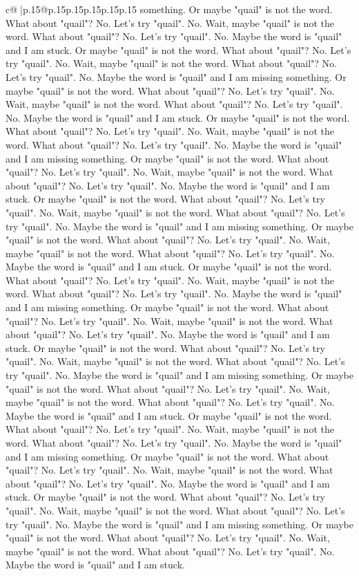 \documentclass{article}
\begin{document}
{\begin{supertabular}{c@{$\;$}|p{.15\linewidth}@{}p{.15\linewidth}p{.15\linewidth}p{.15\linewidth}p{.15\linewidth}p{.15\linewidth}}
{{{something. Or maybe "quail" is not the word. What about "quail"? No. Let's try "quail". No. Wait, maybe "quail" is not the word. What about "quail"? No. Let's try "quail". No. Maybe the word is "quail" and I am stuck. Or maybe "quail" is not the word. What about "quail"? No. Let's try "quail". No. Wait, maybe "quail" is not the word. What about "quail"? No. Let's try "quail". No. Maybe the word is "quail" and I am missing something. Or maybe "quail" is not the word. What about "quail"? No. Let's try "quail". No. Wait, maybe "quail" is not the word. What about "quail"? No. Let's try "quail". No. Maybe the word is "quail" and I am stuck. Or maybe "quail" is not the word. What about "quail"? No. Let's try "quail". No. Wait, maybe "quail" is not the word. What about "quail"? No. Let's try "quail". No. Maybe the word is "quail" and I am missing something. Or maybe "quail" is not the word. What about "quail"? No. Let's try "quail". No. Wait, maybe "quail" is not the word. What about "quail"? No. Let's try "quail". No. Maybe the word is "quail" and I am stuck. Or maybe "quail" is not the word. What about "quail"? No. Let's try "quail". No. Wait, maybe "quail" is not the word. What about "quail"? No. Let's try "quail". No. Maybe the word is "quail" and I am missing something. Or maybe "quail" is not the word. What about "quail"? No. Let's try "quail". No. Wait, maybe "quail" is not the word. What about "quail"? No. Let's try "quail". No. Maybe the word is "quail" and I am stuck. Or maybe "quail" is not the word. What about "quail"? No. Let's try "quail". No. Wait, maybe "quail" is not the word. What about "quail"? No. Let's try "quail". No. Maybe the word is "quail" and I am missing something. Or maybe "quail" is not the word. What about "quail"? No. Let's try "quail". No. Wait, maybe "quail" is not the word. What about "quail"? No. Let's try "quail". No. Maybe the word is "quail" and I am stuck. Or maybe "quail" is not the word. What about "quail"? No. Let's try "quail". No. Wait, maybe "quail" is not the word. What about "quail"? No. Let's try "quail". No. Maybe the word is "quail" and I am missing something. Or maybe "quail" is not the word. What about "quail"? No. Let's try "quail". No. Wait, maybe "quail" is not the word. What about "quail"? No. Let's try "quail". No. Maybe the word is "quail" and I am stuck. Or maybe "quail" is not the word. What about "quail"? No. Let's try "quail". No. Wait, maybe "quail" is not the word. What about "quail"? No. Let's try "quail". No. Maybe the word is "quail" and I am missing something. Or maybe "quail" is not the word. What about "quail"? No. Let's try "quail". No. Wait, maybe "quail" is not the word. What about "quail"? No. Let's try "quail". No. Maybe the word is "quail" and I am stuck. Or maybe "quail" is not the word. What about "quail"? No. Let's try "quail". No. Wait, maybe "quail" is not the word. What about "quail"? No. Let's try "quail". No. Maybe the word is "quail" and I am missing something. Or maybe "quail" is not the word. What about "quail"? No. Let's try "quail". No. Wait, maybe "quail" is not the word. What about "quail"? No. Let's try "quail". No. Maybe the word is "quail" and I am stuck. }}}
\end{supertabular}}
\end{document}
